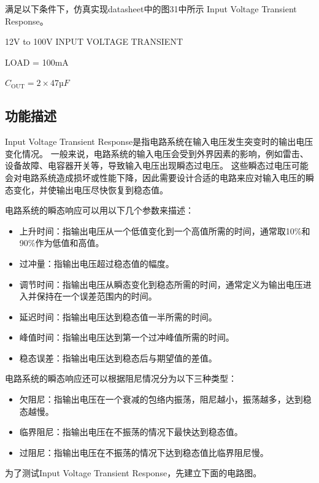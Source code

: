 \documentclass[lang=cn,10pt]{elegantbook}
\begin{document}
满足以下条件下，仿真实现datasheet中的图31中所示 Input Voltage Transient Response。

12V to 100V INPUT VOLTAGE TRANSIENT

LOAD = 100mA

$C_{\text{OUT}} = 2 \times 47µF$

\subsection{功能描述}


Input Voltage Transient Response是指电路系统在输入电压发生突变时的输出电压变化情况。
一般来说，电路系统的输入电压会受到外界因素的影响，例如雷击、设备故障、电容器开关等，导致输入电压出现瞬态过电压。
这些瞬态过电压可能会对电路系统造成损坏或性能下降，因此需要设计合适的电路来应对输入电压的瞬态变化，并使输出电压尽快恢复到稳态值。

电路系统的瞬态响应可以用以下几个参数来描述：

\begin{itemize}
    \item 上升时间：指输出电压从一个低值变化到一个高值所需的时间，通常取10\%和90\%作为低值和高值。
    \item 过冲量：指输出电压超过稳态值的幅度。
    \item 调节时间：指输出电压从瞬态变化到稳态所需的时间，通常定义为输出电压进入并保持在一个误差范围内的时间。
    \item 延迟时间：指输出电压达到稳态值一半所需的时间。
    \item 峰值时间：指输出电压达到第一个过冲峰值所需的时间。
    \item 稳态误差：指输出电压达到稳态后与期望值的差值。
\end{itemize}

电路系统的瞬态响应还可以根据阻尼情况分为以下三种类型：

\begin{itemize}
    \item 欠阻尼：指输出电压在一个衰减的包络内振荡，阻尼越小，振荡越多，达到稳态越慢。
    \item 临界阻尼：指输出电压在不振荡的情况下最快达到稳态值。
    \item 过阻尼：指输出电压在不振荡的情况下达到稳态值比临界阻尼慢。
\end{itemize}

为了测试Input Voltage Transient Response，先建立下面的电路图。
\end{document}
